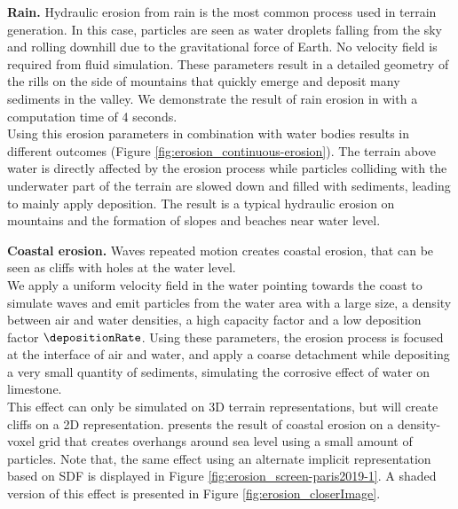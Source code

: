 \textbf{Rain.}
Hydraulic erosion from rain is the most common process used in terrain generation. In this case, particles are seen as water droplets falling from the sky and rolling downhill due to the gravitational force of Earth. No velocity field is required from fluid simulation. These parameters result in a detailed geometry of the rills on the side of mountains that quickly emerge and deposit many sediments in the valley.  
We demonstrate the result of rain erosion in  with a computation time of 4 seconds.  \\
Using this erosion parameters in combination with water bodies results in different outcomes (Figure \ref{fig:erosion_continuous-erosion}). The terrain above water is directly affected by the erosion process while particles colliding with the underwater part of the terrain are slowed down and filled with sediments, leading to mainly apply deposition. The result is a typical hydraulic erosion on mountains and the formation of slopes and beaches near water level.

\textbf{Coastal erosion.}
Waves repeated motion  creates coastal erosion, that can be seen as cliffs with holes at the water level. \\
We apply a uniform velocity field in the water pointing towards the coast to simulate waves and emit particles from the water area with a large size, a density between air and water densities, a high capacity factor and a low deposition factor $\depositionRate$. Using these parameters, the erosion process is focused at the interface of air and water, and apply a coarse detachment while depositing a very small quantity of sediments, simulating the corrosive effect of water on limestone. \\ 
This effect can only be simulated on 3D terrain representations, but will create cliffs on a 2D representation. 
 presents the result of coastal erosion on a density-voxel grid that creates overhangs around sea level using a small amount of particles. Note that, the same effect using an alternate implicit representation based on SDF is displayed in Figure \ref{fig:erosion_screen-paris2019-1}.
A shaded version of this effect is presented in Figure \ref{fig:erosion_closerImage}.

